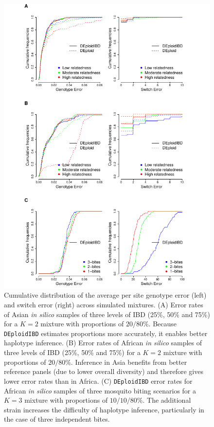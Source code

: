 \documentclass[9pt,lineno]{elife}
\begin{document}
\begin{figure}[htp]
  \begin{center}
    \includegraphics[width=\textwidth]{Fig3.pdf}
    \caption{Cumulative distribution of the average per site genotype error (left) and switch error (right) across simulated mixtures.
    (A) Error rates of Asian {\it in silico} samples of three levels of IBD (25\%, 50\% and 75\%) for a $K=2$ mixture with proportions of $20/80\%$. Because {\tt DEploidIBD} estimates proportions more accurately, it enables better haplotype inference.
    (B) Error rates of African {\it in silico} samples of three levels of IBD (25\%, 50\% and 75\%) for a $K=2$ mixture with proportions of $20/80\%$. Inference in Asia benefits from better reference panels (due to lower overall diversity) and therefore gives lower error rates than in Africa.
    (C) {\tt DEploidIBD} error rates for African {\it in silico} samples of three mosquito biting scenarios for a $K=3$ mixture with proportions of $10/10/80\%$. The additional strain increases the difficulty of haplotype inference, particularly in the case of three independent bites.
    } \label{fig:error-analysis}
  \end{center}
\end{figure}
\end{document}
